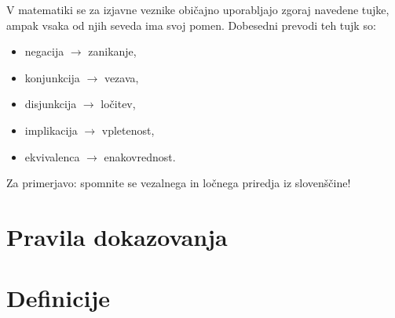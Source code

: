 		\begin{opomba}
			V matematiki se za izjavne veznike običajno uporabljajo zgoraj navedene tujke, ampak vsaka od njih seveda ima svoj pomen. Dobesedni prevodi teh tujk so:
			\begin{itemize}
				\item
					negacija $\to$ zanikanje,
				\item
					konjunkcija $\to$ vezava,
				\item
					disjunkcija $\to$ ločitev,
				\item
					implikacija $\to$ vpletenost,
				\item
					ekvivalenca $\to$ enakovrednost.
			\end{itemize}
			Za primerjavo: spomnite se vezalnega in ločnega priredja iz slovenščine!
		\end{opomba}
	
	
	\section{Pravila dokazovanja}
	\section{Definicije}